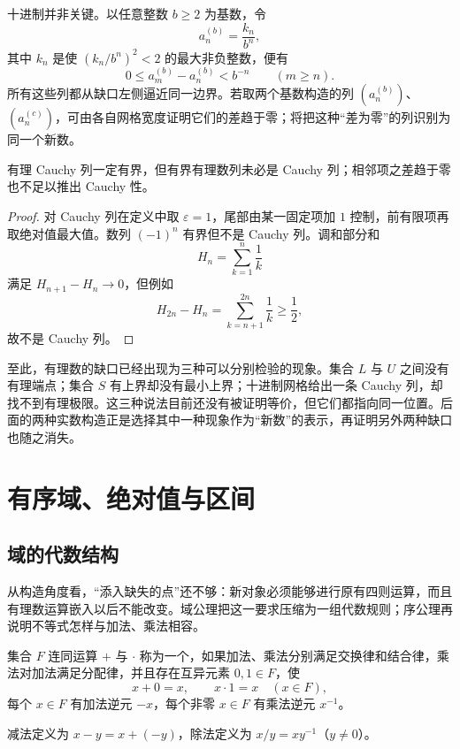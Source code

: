 十进制并非关键。以任意整数 \(b\ge2\) 为基数，令
\[
 a_n^{(b)}=\frac{k_n}{b^n},
\]
其中 \(k_n\) 是使 \((k_n/b^n)^2<2\) 的最大非负整数，便有
\[
 0\le a_m^{(b)}-a_n^{(b)}<b^{-n}\qquad(m\ge n).
\]
所有这些列都从缺口左侧逼近同一边界。若取两个基数构造的列 \((a_n^{(b)})\)、\((a_n^{(c)})\)，可由各自网格宽度证明它们的差趋于零；将把这种“差为零”的列识别为同一个新数。

\begin{proposition}
有理 Cauchy 列一定有界，但有界有理数列未必是 Cauchy 列；相邻项之差趋于零也不足以推出 Cauchy 性。
\end{proposition}

\begin{proof}
对 Cauchy 列在定义中取 \(\varepsilon=1\)，尾部由某一固定项加 \(1\) 控制，前有限项再取绝对值最大值。数列 \((-1)^n\) 有界但不是 Cauchy 列。调和部分和
\[
 H_n=\sum_{k=1}^n\frac1k
\]
满足 \(H_{n+1}-H_n\to0\)，但例如
\[
 H_{2n}-H_n=\sum_{k=n+1}^{2n}\frac1k\ge\frac12,
\]
故不是 Cauchy 列。
\end{proof}

至此，有理数的缺口已经出现为三种可以分别检验的现象。集合 \(L\) 与 \(U\) 之间没有有理端点；集合 \(S\) 有上界却没有最小上界；十进制网格给出一条 Cauchy 列，却找不到有理极限。这三种说法目前还没有被证明等价，但它们都指向同一位置。后面的两种实数构造正是选择其中一种现象作为“新数”的表示，再证明另外两种缺口也随之消失。

\section{有序域、绝对值与区间}

\subsection{域的代数结构}

从构造角度看，“添入缺失的点”还不够：新对象必须能够进行原有四则运算，而且有理数运算嵌入以后不能改变。域公理把这一要求压缩为一组代数规则；序公理再说明不等式怎样与加法、乘法相容。

\begin{definition}
集合 \(F\) 连同运算 \(+\) 与 \(\cdot\) 称为一个，如果加法、乘法分别满足交换律和结合律，乘法对加法满足分配律，并且存在互异元素 \(0,1\in F\)，使
\[
 x+0=x,\qquad x\cdot1=x
 \quad(x\in F),
\]
每个 \(x\in F\) 有加法逆元 \(-x\)，每个非零 \(x\in F\) 有乘法逆元 \(x^{-1}\)。
\end{definition}

减法定义为 \(x-y=x+(-y)\)，除法定义为 \(x/y=xy^{-1}\)（\(y\ne0\)）。

